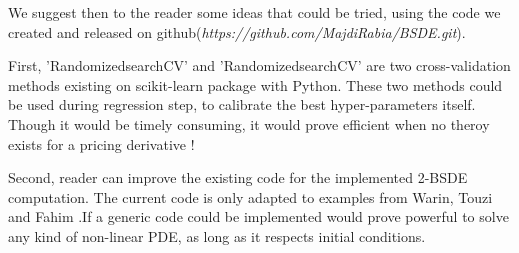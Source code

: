 \documentclass[english,11pt,openany]{report}
\theoremstyle{definition}
\theoremstyle{plain}
\theoremstyle{definition}
\begin{document}
We suggest then to the reader some ideas that could be tried, using the code we created and released on github(\textit{https://github.com/MajdiRabia/BSDE.git}). 

First, 'RandomizedsearchCV' and 'RandomizedsearchCV' are two cross-validation methods existing on scikit-learn package with Python.
These two methods could be used during regression step, to calibrate the best hyper-parameters itself. Though it would be timely consuming, it would prove efficient when no theroy exists for a pricing derivative !

Second, reader can improve the existing code for the implemented 2-BSDE computation. 
The current code is only adapted to examples from Warin, Touzi and Fahim \cite{touzi:2BSDE} .If a generic code could be implemented would prove powerful to solve any kind of non-linear PDE, as long as it respects initial conditions.
\end{document}
